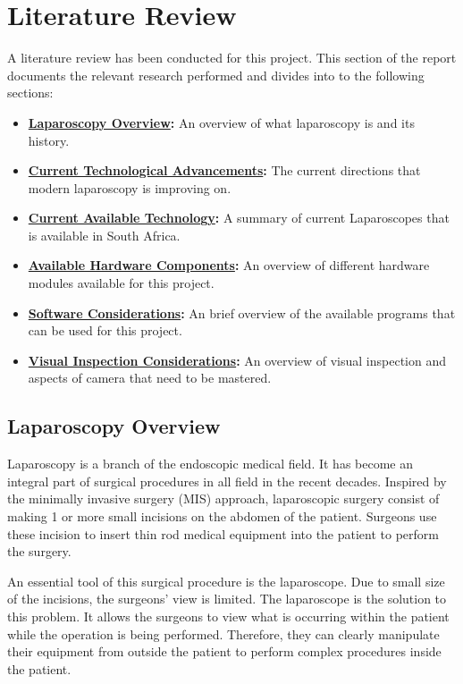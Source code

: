 \chapter{Literature Review}
\label{sec:Literature Review}

A literature review has been conducted for this project. This section of the report documents the relevant research performed and divides into to the following sections:
\begin{itemize}
    \item \textbf{\hyperref[sec:Laparoscopy Overview]{Laparoscopy Overview}:} An overview of what laparoscopy is and its history.
    \item \textbf{\hyperref[sec:Current Technological Advancements]{Current Technological Advancements}:} The current directions that modern laparoscopy is improving on.
    \item \textbf{\hyperref[sec:Current Available Technology]{Current Available Technology}:} A summary of current Laparoscopes that is available in South Africa.
    \item \textbf{\hyperref[sec:Available Hardware Components]{Available Hardware Components}:} An overview of different hardware modules available for this project.
    \item \textbf{\hyperref[sec:Software Considerations]{Software Considerations}:} An brief overview of the available programs that can be used for this project.
    \item \textbf{\hyperref[sec:Visual Inspection Considerations]{Visual Inspection Considerations}:} An overview of visual inspection and aspects of camera that need to be mastered.
\end{itemize}

\section{Laparoscopy Overview}
\label{sec:Laparoscopy Overview}

Laparoscopy is a branch of the endoscopic medical field. It has become an integral part of surgical procedures in all field in the recent decades. Inspired by the minimally invasive surgery (MIS) approach, laparoscopic surgery consist of making 1 or more small incisions on the abdomen of the patient. Surgeons use these incision to insert thin rod medical equipment into the patient to perform the surgery. \citep{FIS-2021}

An essential tool of this surgical procedure is the laparoscope. Due to small size of the incisions, the surgeons' view is limited. The laparoscope is the solution to this problem. It allows the surgeons to view what is occurring within the patient while the operation is being performed. Therefore, they can clearly manipulate their equipment from outside the patient to perform complex procedures inside the patient. \citep{AIP-2018}

